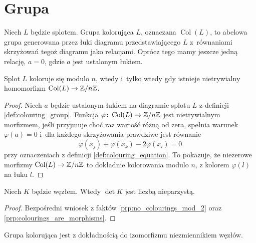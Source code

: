\section{Grupa} %

\begin{definition}
    \label{def:colouring_group}
    Niech $L$ będzie splotem.
    Grupa kolorująca $L$, oznaczana $\operatorname{Col}(L)$, to abelowa grupa generowana przez łuki diagramu przedstawiającego $L$ z~równaniami skrzyżowań tegoż diagramu jako relacjami.
    Oprócz tego mamy jeszcze jedną relację, $a = 0$, gdzie $a$ jest ustalonym łukiem.
\end{definition}

\begin{proposition}
    \label{prp:colourings_are_morphisms}
    Splot $L$ koloruje się modulo $n$, wtedy i~tylko wtedy gdy istnieje nietrywialny homomorfizm $\operatorname{Col}(L) \to \mathbb Z/n\mathbb Z$.
\end{proposition}

\begin{proof}
    Niech $a$ będzie ustalonym łukiem na diagramie splotu $L$ z definicji \ref{def:colouring_group}.
    Funkcja $\varphi \colon \operatorname{Col}(L) \to \mathbb Z/n\mathbb Z$ jest nietrywialnym morfizmem, jeśli przyjmuje choć raz wartość różną od zera, spełnia warunek $\varphi(a) = 0$ i~dla każdego skrzyżowania prawdziwe jest równanie
    \begin{equation}
        \varphi(x_j) + \varphi(x_k) - 2\varphi(x_i) = 0
    \end{equation}
    przy oznaczeniach z definicji \ref{def:colouring_equation}.
    To pokazuje, że niezerowe morfizmy $\operatorname{Col}(L) \to \mathbb Z/n\mathbb Z$ to dokładnie kolorowania modulo $n$, z kolorem $\varphi(l)$ na łuku $l$.
\end{proof}

\begin{corollary}
    \label{cor:knot_determinant_odd}
    Niech $K$ będzie węzłem.
    Wtedy $\det K$ jest liczbą nieparzystą.
\end{corollary}

\begin{proof}
    Bezpośredni wniosek z faktów \ref{prp:no_colourings_mod_2} oraz \ref{prp:colourings_are_morphisms}.
\end{proof}

\begin{proposition}
    Grupa kolorująca jest z dokładnością do izomorfizmu niezmiennikiem węzłów.
\end{proposition}

